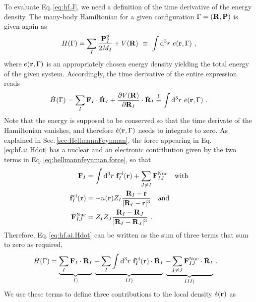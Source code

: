To evaluate Eq.\,\eqref{eq:hf.J}, we need a definition of the time derivative of the energy density. The many-body Hamiltonian for a given configuration $\Gamma = ({\bf R}, {\bf P})$ is given again as
\begin{align}
	H (\Gamma) = \sum_I \frac{{\bf P}_I^2}{2 M_I} + V({\bf R}) 
		~\equiv~ \int {\rm d}^3 r ~ e ({\bf r}, \Gamma)~,
  \label{eq:hf.ai.H}
\end{align}
where $e ({\bf r}, \Gamma)$ is an appropriately chosen energy density yielding the total energy of the given system. Accordingly, the time derivative of the entire expression reads
\begin{align}
	\dot{H} (\Gamma)
		= \sum_I {\bf F}_I \cdot \dot{{\bf R}}_I + \frac{\partial V({\bf R})}{\partial {\bf R}_I} \cdot \dot{{\bf R}}_I
			\label{eq:hf.ai.Hdot}
		\stackrel{!}{\equiv}
			\int {\rm d}^3 r ~ \dot{e} ({\bf r} , \Gamma)~.
\end{align}
Note that the energy is supposed to be conserved so that the time derivate of the Hamiltonian vanishes, and therefore $\dot{e} ({\bf r}, \Gamma)$ needs to integrate to zero.
As explained in Sec.\,\ref{sec:HellmannFeynman}, the force appearing in Eq.\,\eqref{eq:hf.ai.Hdot} has a nuclear and an electronic contribution given by the two terms in Eq.\,\eqref{eq:hellmannfeynman.force}, so that
\begin{align}
	\b F_I
		&%
			= \int \d^3 r ~ \b f_I^{\rm el} (\b r) + \sum_{J \neq I} \b F_{IJ}^{\rm Nuc} \quad\text{with}
		\label{eq:hf.ai.F}\\
	\b f_I^{\rm el} (\b r)
		&= - n(\b r) Z_I \frac{\b R_I - \b r}{\lvert \b R_I - \b r \rvert^3} \quad\text{and} \\
	\b F_{IJ}^{\rm Nuc}
		&= Z_I Z_J \frac{\b R_I - \b R_J}{\lvert \b R_I - \b R_J \rvert^3}~.
\end{align}
Therefore, Eq.\,\eqref{eq:hf.ai.Hdot} can be written as the sum of three terms that sum to zero as required,
\begin{align}
	\dot{H} (\Gamma)
		&= \underset{I)}{\underbrace{\sum_I {\bf F}_I \cdot \dot{{\bf R}}_I}} ~ 
			 \underset{II)}{\underbrace{-\sum_{I} \int {\rm d}^3 r ~ {\bf f}_I^{\rm el} ({\bf r}) \cdot \dot{{\bf R}}_I}} ~
			 \underset{III)}{\underbrace{-\sum_{I \neq J} {\bf F}^{\rm Nuc}_{IJ} \cdot \dot{{\bf R}}_I}}~.
\end{align}
We use these terms to define three contributions to the local density $\dot{e} ({\bf r})$ as
